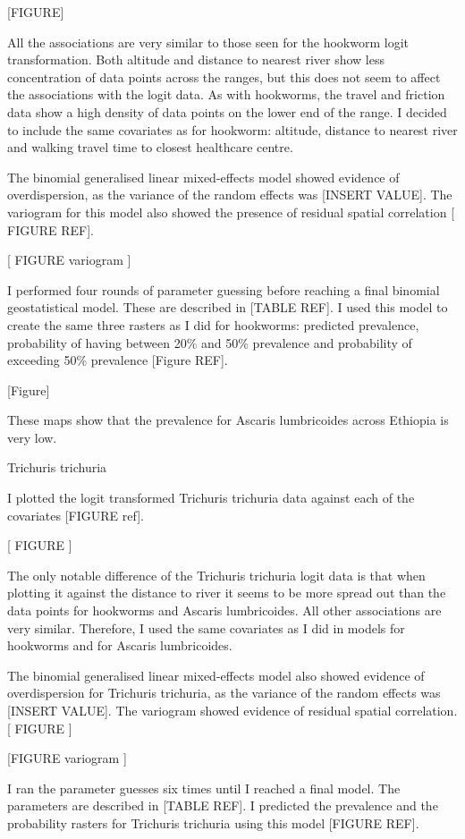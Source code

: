 \documentclass[
]{article}
\begin{document}
{[}FIGURE{]}

All the associations are very similar to those seen for the hookworm
logit transformation. Both altitude and distance to nearest river show
less concentration of data points across the ranges, but this does not
seem to affect the associations with the logit data. As with hookworms,
the travel and friction data show a high density of data points on the
lower end of the range. I decided to include the same covariates as for
hookworm: altitude, distance to nearest river and walking travel time to
closest healthcare centre.

The binomial generalised linear mixed-effects model showed evidence of
overdispersion, as the variance of the random effects was {[}INSERT
VALUE{]}. The variogram for this model also showed the presence of
residual spatial correlation {[} FIGURE REF{]}.

{[} FIGURE variogram {]}

I performed four rounds of parameter guessing before reaching a final
binomial geostatistical model. These are described in {[}TABLE REF{]}. I
used this model to create the same three rasters as I did for hookworms:
predicted prevalence, probability of having between 20\% and 50\%
prevalence and probability of exceeding 50\% prevalence {[}Figure
REF{]}.

{[}Figure{]}

These maps show that the prevalence for Ascaris lumbricoides across
Ethiopia is very low.

Trichuris trichuria

I plotted the logit transformed Trichuris trichuria data against each of
the covariates {[}FIGURE ref{]}.

{[} FIGURE {]}

The only notable difference of the Trichuris trichuria logit data is
that when plotting it against the distance to river it seems to be more
spread out than the data points for hookworms and Ascaris lumbricoides.
All other associations are very similar. Therefore, I used the same
covariates as I did in models for hookworms and for Ascaris
lumbricoides.

The binomial generalised linear mixed-effects model also showed evidence
of overdispersion for Trichuris trichuria, as the variance of the random
effects was {[}INSERT VALUE{]}. The variogram showed evidence of
residual spatial correlation. {[} FIGURE {]}

{[}FIGURE variogram {]}

I ran the parameter guesses six times until I reached a final model. The
parameters are described in {[}TABLE REF{]}. I predicted the prevalence
and the probability rasters for Trichuris trichuria using this model
{[}FIGURE REF{]}.
\end{document}
